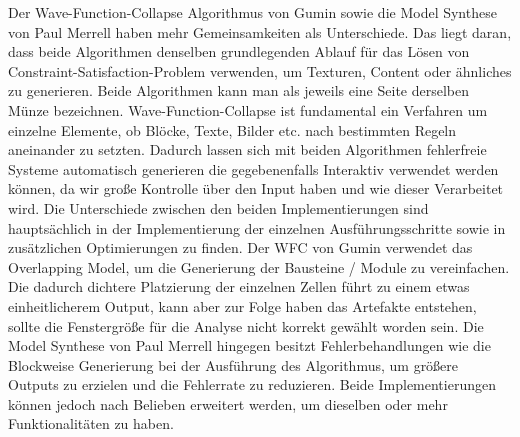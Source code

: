 \documentclass[12pt, a4paper,twoside,openright]{report} %
\begin{document}
Der Wave-Function-Collapse Algorithmus von Gumin sowie die Model Synthese von Paul Merrell haben mehr Gemeinsamkeiten als Unterschiede.
Das liegt daran, dass beide Algorithmen denselben grundlegenden Ablauf für das Lösen von Constraint-Satisfaction-Problem verwenden, um Texturen, Content oder ähnliches zu generieren.
Beide Algorithmen kann man als jeweils eine Seite derselben Münze bezeichnen.
Wave-Function-Collapse ist fundamental  ein Verfahren um einzelne Elemente, ob Blöcke, Texte, Bilder etc. nach bestimmten Regeln aneinander zu setzten.
Dadurch lassen sich mit beiden Algorithmen fehlerfreie Systeme automatisch generieren die gegebenenfalls Interaktiv verwendet werden können,
da wir große Kontrolle über den Input haben und wie dieser Verarbeitet wird.
Die Unterschiede zwischen den beiden Implementierungen sind hauptsächlich in der Implementierung der einzelnen Ausführungsschritte sowie in zusätzlichen Optimierungen zu finden.
Der WFC von Gumin verwendet das Overlapping Model, um die Generierung der Bausteine / Module zu vereinfachen.
Die dadurch dichtere Platzierung der einzelnen Zellen führt zu einem etwas einheitlicherem Output, kann aber zur Folge haben das Artefakte entstehen,
sollte die Fenstergröße für die Analyse nicht korrekt gewählt worden sein.
Die Model Synthese von Paul Merrell hingegen besitzt Fehlerbehandlungen wie die Blockweise Generierung bei der Ausführung des Algorithmus, um größere Outputs zu erzielen und die
Fehlerrate zu reduzieren.
Beide Implementierungen können jedoch nach Belieben erweitert werden, um dieselben oder mehr Funktionalitäten zu haben.

\printbibliography
\end{document}
